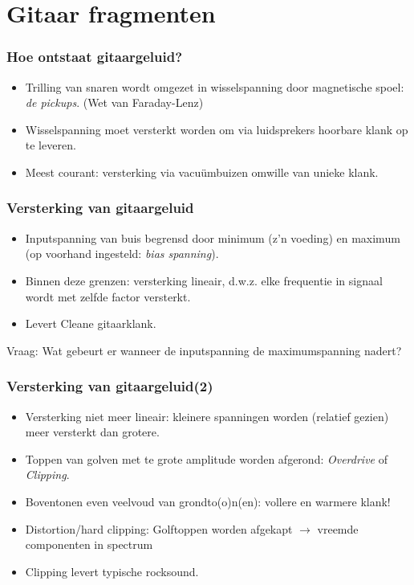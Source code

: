 \documentclass[compress, darktitle, framenumber]{beamer}
\begin{document}
\section{Gitaar fragmenten}

\begin{frame}
\frametitle{Hoe ontstaat gitaargeluid?}
\begin{itemize}
\item Trilling van snaren wordt omgezet in wisselspanning door magnetische spoel: \textit{de pickups}. (Wet van Faraday-Lenz)
\item Wisselspanning moet versterkt worden om via luidsprekers hoorbare klank op te leveren. 
\item Meest courant: versterking via vacu\"umbuizen omwille van unieke klank.
\end{itemize}
\end{frame}

\begin{frame}
\frametitle{Versterking van gitaargeluid}
\begin{itemize}
\item Inputspanning van buis begrensd door minimum (z'n voeding) en maximum (op voorhand ingesteld: \textit{bias spanning}).
\item Binnen deze grenzen: versterking lineair, d.w.z. elke frequentie in signaal wordt met zelfde factor versterkt.
\item Levert Cleane gitaarklank. 
\end{itemize}
\begin{alertblock}{Vraag:}
Wat gebeurt er wanneer de inputspanning de maximumspanning nadert?
\end{alertblock}
\end{frame}

\begin{frame}
\frametitle{Versterking van gitaargeluid(2)}
\begin{itemize}
\item Versterking niet meer lineair: kleinere spanningen worden (relatief gezien) meer versterkt dan grotere.
\item Toppen van golven met te grote amplitude worden afgerond: \textit{Overdrive} of \textit{Clipping}.
\item Boventonen even veelvoud van grondto(o)n(en): vollere en warmere klank!
\item Distortion/hard clipping: Golftoppen worden afgekapt $\rightarrow$ vreemde componenten in spectrum
\item Clipping levert typische rocksound.
\end{itemize}
\end{frame}
\end{document}
